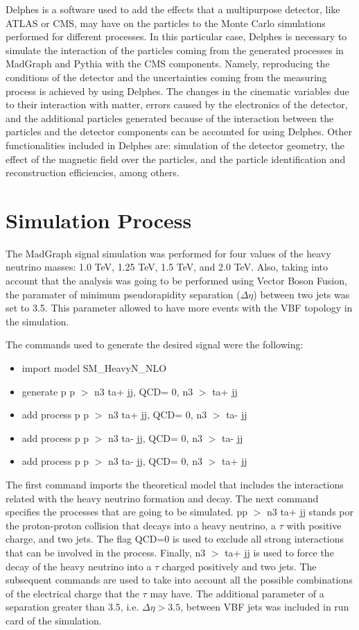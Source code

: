 Delphes is a software used to add the effects that a multipurpose detector, like ATLAS or CMS, may have on the particles to the Monte Carlo simulations performed for different processes. In this particular case, Delphes is necessary to simulate the interaction of the particles coming from the generated processes in MadGraph and Pythia with the CMS components. Namely, reproducing the conditions of the detector and the uncertainties coming from the measuring process is achieved by using Delphes. The changes in the cinematic variables due to their interaction with matter, errors caused by the electronics of the detector, and the additional particles generated because of the interaction between the particles and the detector components can be accounted for using Delphes. Other functionalities included in Delphes are: simulation of the detector geometry, the effect of the magnetic field over the particles, and the particle identification and reconstruction efficiencies, among others.


\section{Simulation Process}

The MadGraph signal simulation was performed for four values of the heavy neutrino masses: 1.0 TeV, 1.25 TeV, 1.5 TeV, and 2.0 TeV. Also, taking into account that the analysis was going to be performed using Vector Boson Fusion, the paramater of minimum pseudorapidity separation ($\Delta \eta$) between two jets was set to 3.5. This parameter allowed to have more events with the VBF topology in the simulation.

The commands used to generate the desired signal were the following:

\begin{itemize}
\item import model SM\_HeavyN\_NLO
\item generate p p $>$ n3 ta+ jj, QCD= 0, n3 $>$ ta+ jj
\item add process p p $>$ n3 ta+ jj, QCD= 0, n3 $>$ ta- jj
\item add process p p $>$ n3 ta- jj, QCD= 0, n3 $>$ ta- jj
\item add process p p $>$ n3 ta- jj, QCD= 0, n3 $>$ ta+ jj

\end{itemize}

The first command imports the theoretical model that includes the interactions related with the heavy neutrino formation and decay. The next command specifies the processes that are going to be simulated. pp $>$ n3 ta+ jj stands por the proton-proton collision that decays into a heavy neutrino, a $\tau$ with positive charge, and two jets. The flag QCD=0 is used to exclude all strong interactions that can be involved in the process. Finally, n3 $>$ ta+ jj is used to force the decay of the heavy neutrino into a $\tau$ charged positively and two jets. The subsequent commands are used to take into account all the possible combinations of the electrical charge that the $\tau$ may have. The additional parameter of a separation greater than 3.5, i.e. $\Delta \eta > 3.5$, between VBF jets was included in run card of the simulation.

